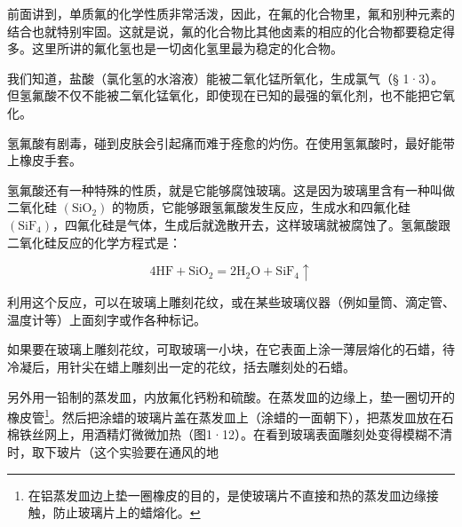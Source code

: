 前面讲到，单质氟的化学性质非常活泼，因此，在氟的化合物里，氟和别种元素的结合也就特别牢固。这就是说，氟的化合物比其他卤素的相应的化合物都要稳定得多。这里所讲的氟化氢也是一切卤化氢里最为稳定的化合物。

我们知道，盐酸（氯化氢的水溶液）能被二氧化锰所氧化，生成氯气（§ 1·3）。
但氢氟酸不仅不能被二氧化锰氧化，即使现在已知的最强的氧化剂，也不能把它氧化。

氢氟酸有剧毒，碰到皮肤会引起痛而难于痊愈的灼伤。在使用氢氟酸时，最好能带上橡皮手套。

氢氟酸还有一种特殊的性质，就是它能够腐蚀玻璃。这是因为玻璃里含有一种叫做二氧化硅
\(\left(\mathrm{SiO}_{2}\right)\)
的物质，它能够跟氢氟酸发生反应，生成水和四氟化硅
\(\left(\mathrm{SiF}_{4}\right)\)，四氟化硅是气体，生成后就逸散开去，这样玻璃就被腐蚀了。氢氟酸跟二氧化硅反应的化学方程式是：

\[
4 \mathrm{HF} + \mathrm{SiO} _ {2} = 2 \mathrm{H} _ {2} \mathrm{O} + \mathrm{SiF} _ {4} \uparrow
\]

利用这个反应，可以在玻璃上雕刻花纹，或在某些玻璃仪器（例如量筒、滴定管、温度计等）上面刻字或作各种标记。

如果要在玻璃上雕刻花纹，可取玻璃一小块，在它表面上涂一薄层熔化的石蜡，待冷凝后，用针尖在蜡上雕刻出一定的花纹，括去雕刻处的石蜡。

另外用一铅制的蒸发皿，内放氟化钙粉和硫酸。在蒸发皿的边缘上，垫一圈切开的橡皮管\footnote{在铝蒸发皿边上垫一圈橡皮的目的，是使玻璃片不直接和热的蒸发皿边缘接触，防止玻璃片上的蜡熔化。}。然后把涂蜡的玻璃片盖在蒸发皿上（涂蜡的一面朝下），把蒸发皿放在石棉铁丝网上，用酒精灯微微加热（图1·12）。在看到玻璃表面雕刻处变得模糊不清时，取下玻片（这个实验要在通风的地

